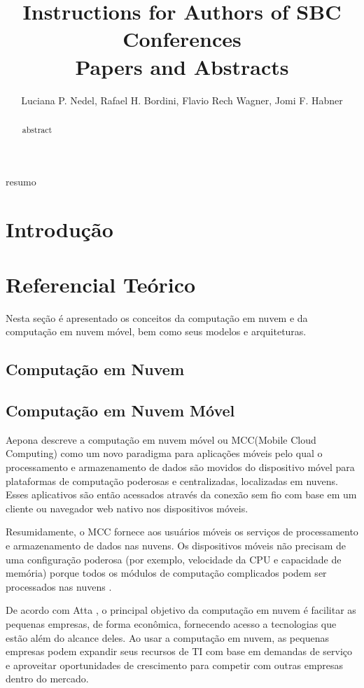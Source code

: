 \documentclass[12pt]{article}
\title{Instructions for Authors of SBC Conferences\\ Papers and Abstracts}
\author{Luciana P. Nedel\inst{1}, Rafael H. Bordini\inst{2}, Flavio Rech
  Wagner\inst{1}, Jomi F. Habner\inst{3} }
\begin{document}
 

\maketitle

\begin{abstract}
  abstract
\end{abstract}

\begin{resumo} 
  resumo
\end{resumo}


\section{Introdução}

\lipsum[1]

\section{Referencial Teórico}

Nesta seção é apresentado os conceitos da computação em nuvem e da computação em nuvem
móvel, bem como seus modelos e arquiteturas.

\subsection{Computação em Nuvem}

\subsection{Computação em Nuvem Móvel}

Aepona \cite{aepona2010} descreve a computação em nuvem móvel ou MCC(Mobile Cloud Computing) como um novo paradigma para aplicações 
móveis pelo qual o processamento e armazenamento de dados são movidos do dispositivo móvel para plataformas de computação
poderosas e centralizadas, localizadas em nuvens. Esses aplicativos são então acessados através da conexão sem fio com base em
um cliente ou navegador web nativo nos dispositivos móveis. 

Resumidamente, o MCC fornece aos usuários móveis os serviços de processamento e armazenamento de dados nas nuvens.
Os dispositivos móveis não precisam de uma configuração poderosa (por exemplo, velocidade da CPU e capacidade de memória)
porque todos os módulos de computação complicados podem ser processados nas nuvens \cite{liu2010}.

De acordo com Atta \cite{atta2013}, o principal objetivo da computação em nuvem é facilitar as pequenas empresas,
de forma econômica, fornecendo acesso a tecnologias que estão além do alcance deles. Ao usar a computação em nuvem, 
as pequenas empresas podem expandir seus recursos de TI com base em demandas de serviço e aproveitar oportunidades 
de crescimento para competir com outras empresas dentro do mercado.
\end{document}
